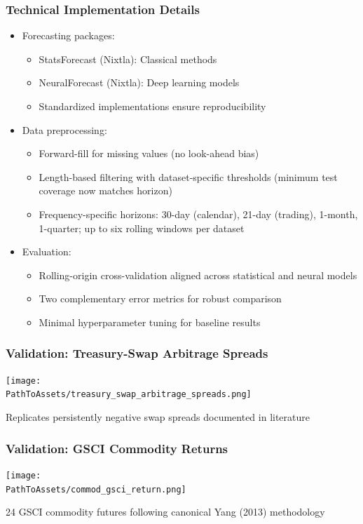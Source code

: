 \documentclass[ignorenonframetext, 9pt]{beamer}
\begin{document}
\begin{frame}
  \frametitle{Technical Implementation Details}
  \label{slide:technical}
\begin{itemize}
\item \alert{Forecasting packages:}
\begin{itemize}
  \item StatsForecast (Nixtla): Classical methods
  \item NeuralForecast (Nixtla): Deep learning models
  \item Standardized implementations ensure reproducibility
\end{itemize}
\vspace{0.3cm}
\item \alert{Data preprocessing:}
\begin{itemize}
  \item Forward-fill for missing values (no look-ahead bias)
  \item Length-based filtering with dataset-specific thresholds (minimum test coverage now matches horizon)
  \item Frequency-specific horizons: 30-day (calendar), 21-day (trading), 1-month, 1-quarter; up to six rolling windows per dataset
\end{itemize}
\vspace{0.3cm}
\item \alert{Evaluation:}
\begin{itemize}
  \item Rolling-origin cross-validation aligned across statistical and neural models
  \item Two complementary error metrics for robust comparison
  \item Minimal hyperparameter tuning for baseline results
\end{itemize}
\end{itemize}
\end{frame}

\begin{frame}
  \frametitle{Validation: Treasury-Swap Arbitrage Spreads}
  \centering
  \texttt{[image: \\PathToAssets/treasury\_swap\_arbitrage\_spreads.png]}
  \vspace{0.2cm}

  \scriptsize
  Replicates persistently negative swap spreads documented in literature
\end{frame}

\begin{frame}
  \frametitle{Validation: GSCI Commodity Returns}
  \centering
  \texttt{[image: \\PathToAssets/commod\_gsci\_return.png]}
  \vspace{0.2cm}

  \scriptsize
  24 GSCI commodity futures following canonical Yang (2013) methodology
\end{frame}
\end{document}

